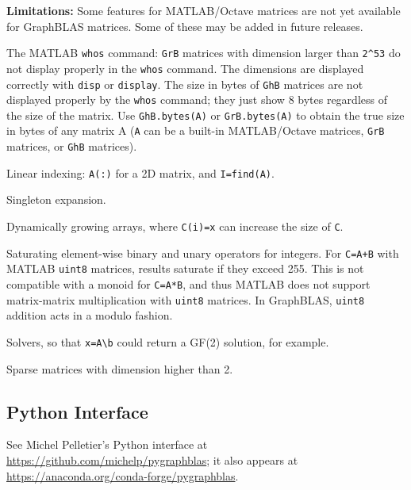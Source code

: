 {\bf Limitations:}
Some features for MATLAB/Octave matrices are not yet available for
GraphBLAS matrices.  Some of these may be added in future releases.

\begin{packed_itemize}
    \item The MATLAB \verb'whos' command:  \verb'GrB' matrices with dimension
        larger than \verb'2^53' do not display properly in the \verb'whos'
        command.  The dimensions are displayed correctly with \verb'disp' or
        \verb'display'.  The size in bytes of \verb'GhB' matrices are not
        displayed properly by the \verb'whos' command; they just show 8 bytes
        regardless of the size of the matrix.  Use \verb'GhB.bytes(A)' or
        \verb'GrB.bytes(A)' to obtain the true size in bytes of any matrix A
        (\verb'A' can be a built-in MATLAB/Octave matrices, \verb'GrB'
        matrices, or \verb'GhB' matrices).
    \item Linear indexing: \verb'A(:)' for a 2D matrix, and \verb'I=find(A)'.
    \item Singleton expansion.
    \item Dynamically growing arrays, where \verb'C(i)=x' can increase
        the size of \verb'C'.
    \item Saturating element-wise binary and unary operators for integers.
        For \verb'C=A+B' with MATLAB \verb'uint8' matrices, results
        saturate if they exceed 255.  This is not compatible with
        a monoid for \verb'C=A*B', and thus MATLAB does not support
        matrix-matrix multiplication with \verb'uint8' matrices.
        In GraphBLAS, \verb'uint8' addition acts in a modulo fashion.
    \item Solvers, so that \verb'x=A\b' could return a GF(2) solution,
        for example.
    \item Sparse matrices with dimension higher than 2.
\end{packed_itemize}



\subsection{Python Interface}
\label{python}

See Michel Pelletier's Python interface at
\url{https://github.com/michelp/pygraphblas};
it also appears at
\url{https://anaconda.org/conda-forge/pygraphblas}.

